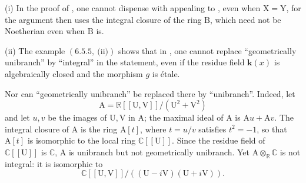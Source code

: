 \begin{remarks}[6.15.11]
\label{IV.6.15.11}
(i) In the proof of , one cannot dispense with
appealing to , even when $\mathrm{X}=\mathrm{Y}$, for the argument then
uses the integral closure of the ring $\mathrm{B}$, which need not be Noetherian even
when $\mathrm{B}$ is.

(ii) The example $(6.5.5,~\text{(ii)})$ shows that in , one cannot replace
``geometrically unibranch'' by ``integral'' in the statement, even if the residue field
$\boldsymbol{k}(x)$ is algebraically closed and the morphism $g$ is \'etale.

Nor can ``geometrically unibranch'' be replaced there by ``unibranch''.
Indeed, let
\[
 \mathrm{A}=\mathbb{R}[[\mathrm{U},\mathrm{V}]]/(\mathrm{U}^2+\mathrm{V}^2)
\]
and let $u,v$ be the images of $\mathrm{U},\mathrm{V}$ in $\mathrm{A}$; the maximal
ideal of $\mathrm{A}$ is $\mathrm{A}u+\mathrm{A}v$.
The integral closure of $\mathrm{A}$ is the ring $\mathrm{A}[t]$, where $t=u/v$
satisfies $t^2=-1$, so that $\mathrm{A}[t]$ is isomorphic to the local ring
$\mathbb{C}[[\mathrm{U}]]$.
Since the residue field of $\mathbb{C}[[\mathrm{U}]]$ is $\mathbb{C}$,
$\mathrm{A}$ is unibranch but not geometrically unibranch.
Yet $\mathrm{A}\otimes_{\mathbb{R}}\mathbb{C}$ is not integral: it is isomorphic to
\[
 \mathbb{C}[[\mathrm{U},\mathrm{V}]]/
 ((\mathrm{U}-i\mathrm{V})(\mathrm{U}+i\mathrm{V})).
\]
\end{remarks}
